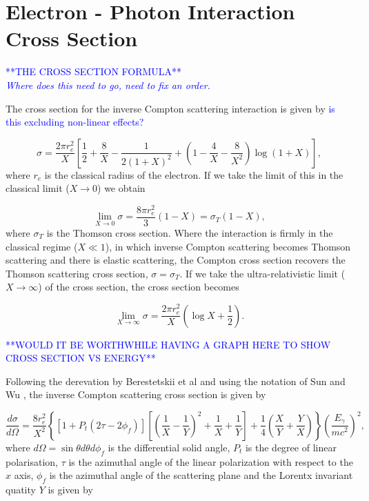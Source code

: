 \documentclass[../main.tex]{subfiles}
\begin{document}
\section{Electron - Photon Interaction Cross Section}

\textcolor{blue}{**THE CROSS SECTION FORMULA** \\ \textit{Where does this need to go, need to fix an order.}}

The cross section for the inverse Compton scattering interaction \cite{berestetskii1982quantum} is given by \textcolor{blue}{is this excluding non-linear effects?}

\begin{equation}
 \sigma = \frac{2\pi r_{e}^{2}}{X}\left[\frac{1}{2}+\frac{8}{X}-\frac{1}{2\left(1+X\right)^{2}}+\left(1-\frac{4}{X}-\frac{8}{X^{2}}\right)\log{\left(1+X\right)}\right],
 \label{eq:compton_cross_section}
\end{equation}
where $r_{e}$ is the classical radius of the electron. If we take the limit of this in the classical limit ($X \to 0$) we obtain

\begin{equation}
\lim_{X \to 0} \sigma = \frac{8\pi r_{e}^{2}}{3}\left(1-X\right) = \sigma_{T}\left(1-X\right),
\label{eq:compton_cross_section_classical_limit}
\end{equation}
where $\sigma_{T}$ is the Thomson cross section. Where the interaction is firmly in the classical regime ($X \ll 1$), in which inverse Compton scattering becomes Thomson scattering and there is elastic scattering, the Compton cross section recovers the Thomson scattering cross section, $\sigma = \sigma_{T}$. If we take the ultra-relativistic limit ($X \to \infty$) of the cross section, the cross section becomes

\begin{equation}
\lim_{X \to \infty} \sigma = \frac{2\pi r_{e}^{2}}{X}\left(\log{X}+\frac{1}{2}\right).
\label{eq:compton_cross_section_ultrarelativistic_limit}
\end{equation}

\textcolor{blue}{**WOULD IT BE WORTHWHILE HAVING A GRAPH HERE TO SHOW CROSS SECTION VS ENERGY**}

Following the derevation by Berestetskii et al \cite{berestetskii1982quantum} and using the notation of Sun and Wu \cite{sun2011theoretical}, the inverse Compton scattering cross section is given by

\begin{equation}
\frac{d\sigma}{d\Omega} = \frac{8r_{e}^{2}}{X^{2}}\left\{\left[1+P_{t}\left(2\tau-2\phi_{f}\right)\right]\left[\left(\frac{1}{X}-\frac{1}{Y}\right)^{2}+\frac{1}{X}+\frac{1}{Y}\right]+\frac{1}{4}\left(\frac{X}{Y}+\frac{Y}{X}\right)\right\}\left(\frac{E_{\gamma}}{mc^{2}}\right)^{2},    
\end{equation}
where $d\Omega = \sin\theta d\theta d\phi_{f}$ is the differential solid angle, $P_{t}$ is the degree of linear polarisation, $\tau$ is the azimuthal angle of the linear polarization with respect to the $x$ axis, $\phi_{f}$ is the azimuthal angle of the scattering plane and the Lorentx invariant quatity $Y$ is given by
\end{document}
